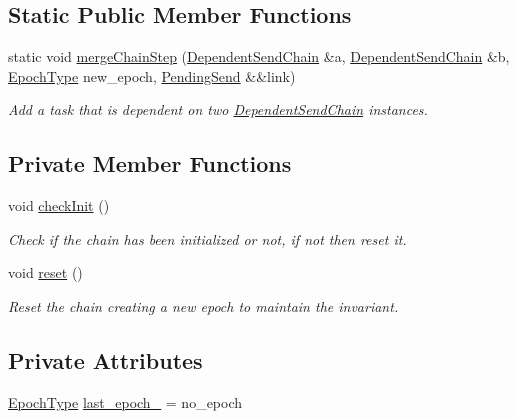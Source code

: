 \subsection*{Static Public Member Functions}
\begin{DoxyCompactItemize}
\item 
static void \hyperlink{classvt_1_1messaging_1_1_dependent_send_chain_a88c235288669210ba02b33185df1005d}{merge\+Chain\+Step} (\hyperlink{classvt_1_1messaging_1_1_dependent_send_chain}{Dependent\+Send\+Chain} \&a, \hyperlink{classvt_1_1messaging_1_1_dependent_send_chain}{Dependent\+Send\+Chain} \&b, \hyperlink{namespacevt_a81d11b28122d43bf9834577e4a06440f}{Epoch\+Type} new\+\_\+epoch, \hyperlink{structvt_1_1messaging_1_1_pending_send}{Pending\+Send} \&\&link)
\begin{DoxyCompactList}\small\item\em Add a task that is dependent on two \hyperlink{classvt_1_1messaging_1_1_dependent_send_chain}{Dependent\+Send\+Chain} instances. \end{DoxyCompactList}\end{DoxyCompactItemize}
\subsection*{Private Member Functions}
\begin{DoxyCompactItemize}
\item 
void \hyperlink{classvt_1_1messaging_1_1_dependent_send_chain_a2ebf8a8d7c1cc95afe97ea6f717258c7}{check\+Init} ()
\begin{DoxyCompactList}\small\item\em Check if the chain has been initialized or not, if not then reset it. \end{DoxyCompactList}\item 
void \hyperlink{classvt_1_1messaging_1_1_dependent_send_chain_aa5cf0fcb78d89b1491b154c820eb9ec6}{reset} ()
\begin{DoxyCompactList}\small\item\em Reset the chain creating a new epoch to maintain the invariant. \end{DoxyCompactList}\end{DoxyCompactItemize}
\subsection*{Private Attributes}
\begin{DoxyCompactItemize}
\item 
\hyperlink{namespacevt_a81d11b28122d43bf9834577e4a06440f}{Epoch\+Type} \hyperlink{classvt_1_1messaging_1_1_dependent_send_chain_acbba3599015aff00654f3cb8efaba623}{last\+\_\+epoch\+\_\+} = no\+\_\+epoch
\end{DoxyCompactItemize}


